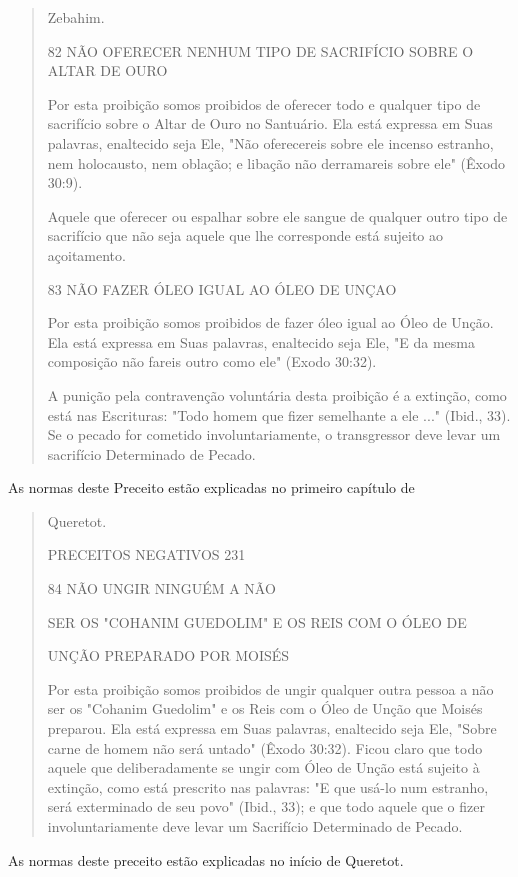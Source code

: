 \begin{quote}
Zebahim.

82 NÃO OFERECER NENHUM TIPO DE SACRIFÍCIO SOBRE O ALTAR DE OURO

Por esta proibição somos proibidos de oferecer todo e qualquer ti­po de
sacrifício sobre o Altar de Ouro no Santuário. Ela está expressa em Suas
palavras, enaltecido seja Ele, "Não oferecereis sobre ele incenso
estranho, nem holocausto, nem oblação; e libação não derramareis sobre
ele" (Êxodo 30:9).

Aquele que oferecer ou espalhar sobre ele sangue de qualquer outro tipo
de sacrifício que não seja aquele que lhe corresponde está sujeito ao
açoitamento.

83 NÃO FAZER ÓLEO IGUAL AO ÓLEO DE UNÇAO

Por esta proibição somos proibidos de fazer óleo igual ao Óleo de Unção.
Ela está expressa em Suas palavras, enaltecido seja Ele, "E da mesma
composição não fareis outro como ele" (Exodo 30:32).

A punição pela contravenção voluntária desta proibição é a extin­ção,
como está nas Escrituras: "Todo homem que fizer semelhante a ele ..."
(Ibid., 33). Se o pecado for cometido involuntariamente, o transgressor
deve levar um sacrifício Determinado de Pecado.
\end{quote}

As normas deste Preceito estão explicadas no primeiro capítulo de

\begin{quote}
Queretot.

PRECEITOS NEGATIVOS 231

84 NÃO UNGIR NINGUÉM A NÃO

SER OS "COHANIM GUEDOLIM" E OS REIS COM O ÓLEO DE

UNÇÃO PREPARADO POR MOISÉS

Por esta proibição somos proibidos de ungir qualquer outra pessoa a não
ser os "Cohanim Guedolim" e os Reis com o Óleo de Unção que Moisés
preparou. Ela está expressa em Suas palavras, enaltecido seja Ele,
"Sobre carne de homem não será untado" (Êxodo 30:32). Ficou claro que
todo aquele que deliberadamente se ungir com Óleo de Unção está sujeito
à extinção, como es­tá prescrito nas palavras: "E que usá-lo num
estranho, será exterminado de seu povo" (Ibid., 33); e que todo aquele
que o fizer involuntariamente deve levar um Sacrifício Determinado de
Pecado.
\end{quote}

As normas deste preceito estão explicadas no início de Queretot.

